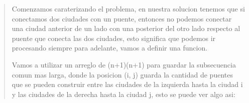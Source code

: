 \begin{quote}
    Comenzamos caraterizando el problema, en nuestra solucion tenemos que si conectamos dos ciudades con un puente, entonces no podemos conectar una ciudad anterior de un lado con una posterior del otro lado respecto al puente que conecta las dos ciudades, esto significa que podemos ir procesando siempre para adelante, vamos a definir una funcion. \vspace{.2cm}

    Vamos a utilizar un arreglo de (n+1)(n+1) para guardar la subsecuencia comun mas larga, donde la posicion (i, j) guarda la cantidad de puentes que se pueden construir entre las ciudades de la izquierda hasta la ciudad i y las ciudades de la derecha hasta la ciudad j, esto se puede ver algo asi: \vspace{.2cm}   


\end{quote}
